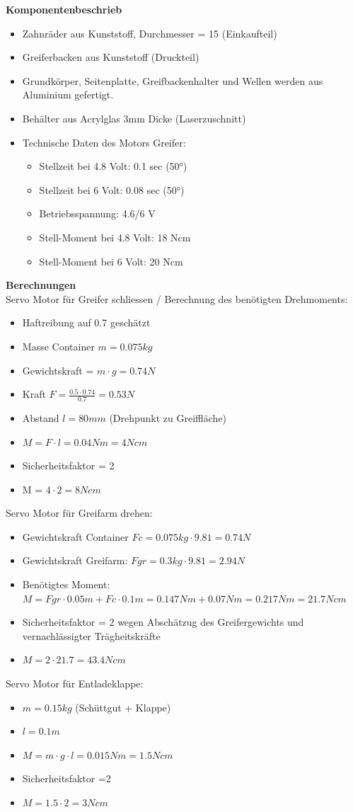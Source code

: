 \textbf{Komponentenbeschrieb}\\[0.2cm]
\begin{itemize}
\item Zahnräder aus Kunststoff, Durchmesser = 15 (Einkaufteil)
\item Greiferbacken aus Kunststoff (Druckteil)
\item Grundkörper, Seitenplatte, Greifbackenhalter und Wellen werden aus Aluminium gefertigt.
\item Behälter aus Acrylglas 3mm Dicke (Laserzuschnitt)
\item Technische Daten des Motors Greifer:
\begin{itemize}
\item Stellzeit bei 4.8 Volt: 0.1 sec (50°) 
\item Stellzeit bei 6 Volt: 0.08 sec (50°) 
\item Betriebsspannung: 4.6/6 V
\item Stell-Moment bei 4.8 Volt: 18 Ncm
\item Stell-Moment bei 6 Volt: 20 Ncm 
\end{itemize}
\end{itemize}
\textbf{Berechnungen}\\[0.2cm]
Servo Motor für Greifer schliessen /
Berechnung des benötigten Drehmoments: 
\begin{itemize}
\item Haftreibung auf 0.7 geschätzt
\item Masse Container $m = 0.075kg$
\item Gewichtskraft = $m\cdot g = 0.74 N$
\item Kraft $F = \frac{0.5\cdot 0.74}{0.7} = 0.53 N$
\item Abstand $l = 80mm$ (Drehpunkt zu Greiffläche)
\item $M = F\cdot l = 0.04 Nm = 4 Ncm$
\item Sicherheitsfaktor = 2
\item M = $4\cdot 2 = 8 Ncm$
\end{itemize}
Servo Motor für Greifarm drehen:
\begin{itemize}
\item Gewichtskraft Container $Fc = 0.075kg\cdot 9.81 = 0.74 N$
\item Gewichtskraft Greifarm: $Fgr = 0.3kg\cdot 9.81 = 2.94 N$
\item Benötigtes Moment:
$M = Fgr\cdot 0.05m+Fc\cdot 0.1m = 0.147Nm+0.07Nm = 0.217Nm = 21.7Ncm$
\item Sicherheitsfaktor = 2 wegen Abschätzug des Greifergewichts und vernachlässigter Trägheitskräfte
\item $M = 2 \cdot 21.7 = 43.4 Ncm$
\end{itemize}
Servo Motor für Entladeklappe:
\begin{itemize}
\item $m = 0.15kg$ (Schüttgut + Klappe)
\item $l = 0.1m$
\item $M = m\cdot g\cdot l = 0.015Nm = 1.5Ncm$
\item Sicherheitsfaktor =2
\item $M = 1.5\cdot 2 = 3Ncm$
\end{itemize}